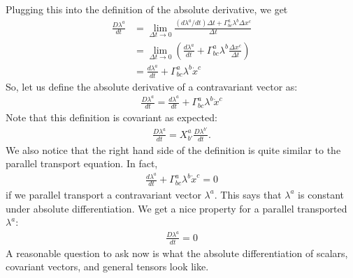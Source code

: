 \documentclass{book}
\theoremstyle{definition}
\begin{document}
Plugging this into the definition of the absolute derivative, we get
\begin{align*}
\frac{D\lambda^a}{dt} &= \lim\limits_{\Delta t \rightarrow 0}\frac{(d\lambda^a/dt)\Delta t + \Gamma^a_{bc}\lambda^b\Delta x^c}{\Delta t}\\
&= \lim\limits_{\Delta t \rightarrow 0}\left( \frac{d\lambda^a}{dt} + \Gamma^a_{bc}\lambda^b\frac{\Delta x^c}{\Delta t} \right)\\
&= \frac{d\lambda^a}{dt} + \Gamma^a_{bc}\lambda^b\dot{x}^c 
\end{align*}
So, let us define the absolute derivative of a contravariant vector as:
\begin{align*}
\boxed{\frac{D\lambda^a}{dt} = \frac{d\lambda^a}{dt} + \Gamma^a_{bc}\lambda^b\dot{x}^c}
\end{align*}
Note that this definition is covariant as expected:
\begin{align*}
\frac{D\lambda^a}{dt} = X^{a}_{b'}\frac{D\lambda^{b'}}{dt}.
\end{align*}
We also notice that the right hand side of the definition is quite similar to the parallel transport equation. In fact, 
\begin{align*}
\frac{d\lambda^a}{dt} + \Gamma^a_{bc}\lambda^b\dot{x}^c = 0
\end{align*}
if we parallel transport a contravariant vector $\lambda^a$. This says that $\lambda^a$ is constant under absolute differentiation. We get a nice property for a parallel transported $\lambda^a$:
\begin{align*}
\boxed{\frac{D\lambda^a}{dt} = 0}
\end{align*}
A reasonable question to ask now is what the absolute differentiation of scalars, covariant vectors, and general tensors look like. \\
\end{document}
